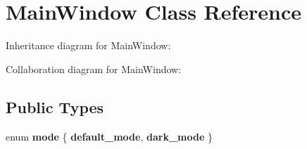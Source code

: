 \hypertarget{class_main_window}{}\section{Main\+Window Class Reference}
\label{class_main_window}


Inheritance diagram for Main\+Window\+:


Collaboration diagram for Main\+Window\+:
\subsection*{Public Types}
\begin{DoxyCompactItemize}
\item 
\mbox{\label{class_main_window_a084c1dc594e504659ff9e10c7f870bd2}} 
enum {\bfseries mode} \{ {\bfseries default\+\_\+mode}, 
{\bfseries dark\+\_\+mode}
 \}
\end{DoxyCompactItemize}
